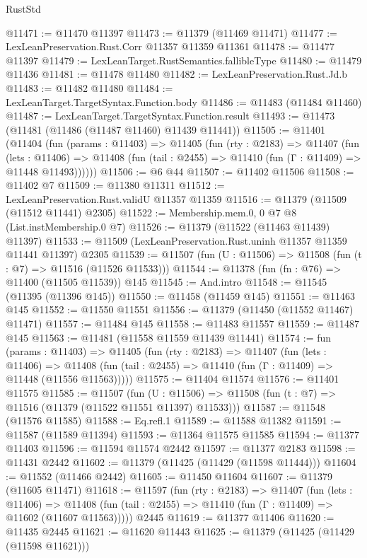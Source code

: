 \begin{lexlean}{RustStd}
\begin{coremodule}
@11471 := @11470 @11397
@11473 := @11379 (@11469 @11471)
@11477 := LexLeanPreservation.Rust.Corr @11357 @11359 @11361
@11478 := @11477 @11397
@11479 := LexLeanTarget.RustSemantics.fallibleType
@11480 := @11479 @11436
@11481 := @11478 @11480
@11482 := LexLeanPreservation.Rust.Jd.b
@11483 := @11482 @11480
@11484 := LexLeanTarget.TargetSyntax.Function.body
@11486 := @11483 (@11484 @11460)
@11487 := LexLeanTarget.TargetSyntax.Function.result
@11493 := @11473 (@11481 (@11486 (@11487 @11460) @11439 @11441))
@11505 := @11401
    (@11404
      (fun (params : @11403) =>
      @11405
        (fun (rty : @2183) =>
        @11407
          (fun (lets : @11406) =>
          @11408 (fun (tail : @2455) => @11410 (fun (Γ : @11409) => @11448 @11493))))))
@11506 := @6 @44
@11507 := @11402 @11506
@11508 := @11402 @7
@11509 := @11380 @11311
@11512 := LexLeanPreservation.Rust.validU @11357 @11359
@11516 := @11379 (@11509 (@11512 @11441) @2305)
@11522 := Membership.mem.{0, 0} @7 @8 (List.instMembership.{0} @7)
@11526 := @11379 (@11522 (@11463 @11439) @11397)
@11533 := @11509 (LexLeanPreservation.Rust.uninh @11357 @11359 @11441 @11397) @2305
@11539 := @11507 (fun (U : @11506) => @11508 (fun (t : @7) => @11516 (@11526 @11533)))
@11544 := @11378 (fun (fn : @76) => @11400 (@11505 @11539)) @145
@11545 := And.intro
@11548 := @11545 (@11395 (@11396 @145))
@11550 := @11458 (@11459 @145)
@11551 := @11463 @145
@11552 := @11550 @11551
@11556 := @11379 (@11450 (@11552 @11467) @11471)
@11557 := @11484 @145
@11558 := @11483 @11557
@11559 := @11487 @145
@11563 := @11481 (@11558 @11559 @11439 @11441)
@11574 := fun (params : @11403) =>
  @11405
    (fun (rty : @2183) =>
    @11407
      (fun (lets : @11406) =>
      @11408 (fun (tail : @2455) => @11410 (fun (Γ : @11409) => @11448 (@11556 @11563)))))
@11575 := @11404 @11574
@11576 := @11401 @11575
@11585 := @11507
    (fun (U : @11506) => @11508 (fun (t : @7) => @11516 (@11379 (@11522 @11551 @11397) @11533)))
@11587 := @11548 (@11576 @11585)
@11588 := Eq.refl.{1}
@11589 := @11588 @11382
@11591 := @11587 (@11589 @11394)
@11593 := @11364 @11575 @11585
@11594 := @11377 @11403
@11596 := @11594 @11574 @2442
@11597 := @11377 @2183
@11598 := @11431 @2442
@11602 := @11379 (@11425 (@11429 (@11598 @11444)))
@11604 := @11552 (@11466 @2442)
@11605 := @11450 @11604
@11607 := @11379 (@11605 @11471)
@11618 := @11597
    (fun (rty : @2183) =>
    @11407
      (fun (lets : @11406) =>
      @11408 (fun (tail : @2455) => @11410 (fun (Γ : @11409) => @11602 (@11607 @11563)))))
    @2445
@11619 := @11377 @11406
@11620 := @11435 @2445
@11621 := @11620 @11443
@11625 := @11379 (@11425 (@11429 (@11598 @11621)))

\end{coremodule}
\end{lexlean}
